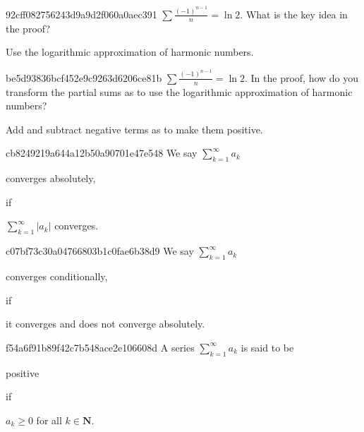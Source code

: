 \begin{note}{92cff082756243d9a9d2f060a0aec391}
    \({ \sum \frac{(-1)^{n-1}}{n} = \ln 2 }\).
    What is the key idea in the proof?

    \begin{cloze}{1}
        Use the logarithmic approximation of harmonic numbers.
    \end{cloze}
\end{note}

\begin{note}{be5d93836bcf452e9c9263d6206ce81b}
    \({ \sum \frac{(-1)^{n-1}}{n} = \ln 2 }\).
    In the proof, how do you transform the partial sums as to use the logarithmic approximation of harmonic numbers?

    \begin{cloze}{1}
        Add and subtract negative terms as to make them positive.
    \end{cloze}
\end{note}

\begin{note}{cb8249219a644a12b50a90701e47e548}
    We say \({ \sum_{k=1}^{\infty} a_k }\) \begin{icloze}{2}converges absolutely,\end{icloze} if \begin{icloze}{1}\({ \sum_{k=1}^{\infty} \left\lvert a_k \right\rvert }\) converges.\end{icloze}
\end{note}

\begin{note}{c07bf73c30a04766803b1c0fae6b38d9}
    We say \({ \sum_{k=1}^{\infty} a_k }\) \begin{icloze}{2}converges conditionally,\end{icloze} if \begin{icloze}{1}it converges and does not converge absolutely.\end{icloze}
\end{note}

\begin{note}{f54a6f91b89f42c7b548ace2e106608d}
    A series \({ \sum_{k=1}^{\infty} a_k }\) is said to be \begin{icloze}{2}positive\end{icloze} if \begin{icloze}{1}\({ a_k \geq 0 }\) for all \({ k \in \mathbf{N} }\).\end{icloze}
\end{note}

